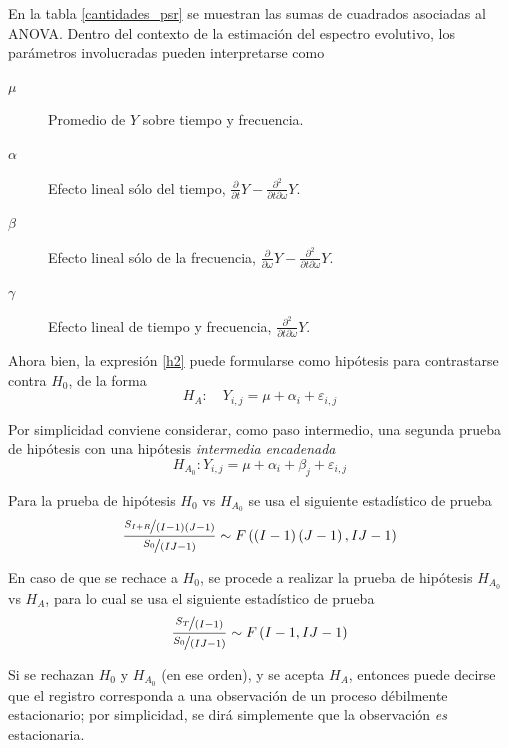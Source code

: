 \documentclass[12pt,letterpaper]{book}
\begin{document}
En la tabla \ref{cantidades_psr} se muestran las sumas de cuadrados asociadas al ANOVA.
%
Dentro del contexto de la estimación del espectro evolutivo, los parámetros involucradas pueden interpretarse como
\begin{description}
\item[$\mu$] Promedio de $Y$ sobre tiempo y frecuencia.
\item[$\alpha$] Efecto lineal sólo del tiempo, $\frac{\partial}{\partial t} Y - \frac{\partial^2}{\partial t \partial \omega} Y$.
\item[$\beta$] Efecto lineal sólo de la frecuencia, $\frac{\partial}{\partial \omega} Y - \frac{\partial^2}{\partial t \partial \omega} Y$.
\item[$\gamma$] Efecto lineal de tiempo y frecuencia, $\frac{\partial^2}{\partial t \partial \omega} Y$.
\end{description}

Ahora bien, la expresión \ref{h2} puede formularse como hipótesis para contrastarse contra $H_0$, de la forma
%
\begin{equation}
H_A : \hspace{1em} Y_{i,j} = \mu + \alpha_i + \varepsilon_{i,j}
\end{equation}

Por simplicidad conviene considerar, como paso intermedio, una segunda prueba de hipótesis con una hipótesis \textit{intermedia} \textit{encadenada}
\begin{equation}
H_{A_0} : Y_{i,j} = \mu + \alpha_i + \beta_j + \varepsilon_{i,j}
\end{equation}

Para la prueba de hipótesis $H_0$ vs $H_{A_0}$ se usa el siguiente estadístico de prueba
\begin{equation}
\frac{\nicefrac{S_{I+R}}{(I-1)(J-1)}}{\nicefrac{S_0}{(IJ-1)}}
\sim F \left(\left(I-1 \right)\left(J-1 \right) , IJ-1 \right)
\end{equation}

En caso de que se rechace a $H_0$, se procede a realizar la prueba de hipótesis $H_{A_0}$ vs $H_{A}$, para lo cual se usa el siguiente estadístico de prueba
\begin{equation}
\frac{\nicefrac{S_{T}}{(I-1)}}{\nicefrac{S_0}{(IJ-1)}}
\sim F \left( I-1  , IJ-1 \right)
\end{equation}

Si se rechazan $H_0$ y $H_{A_0}$ (en ese orden), y se acepta $H_A$, entonces puede decirse que el registro corresponda a una observación de un proceso débilmente estacionario; por simplicidad, se dirá simplemente que la observación \textit{es} estacionaria.
\end{document}
